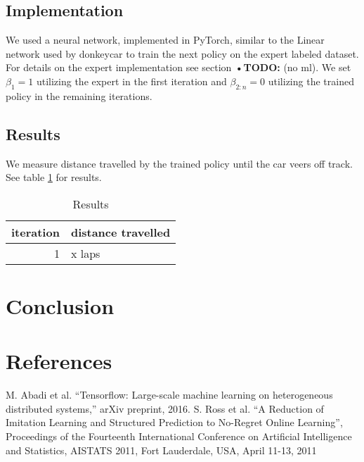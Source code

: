 \documentclass[conference]{IEEEtran}
\begin{document}
\subsection{Implementation}
We used a neural network, implemented in PyTorch, similar to the Linear network used by donkeycar to train the next policy on the expert labeled dataset. For details on the expert implementation see section \textbf{•TODO:} (no ml). We set \( \beta_1 = 1 \) utilizing the expert in the first iteration and \( \beta_{2:n} = 0 \) utilizing the trained policy in the remaining iterations.

\subsection{Results}
We measure distance travelled by the trained policy until the car veers off track. See table \ref{tab:results} for results.

\begin{table}[!t]
\renewcommand{\arraystretch}{1.3}
\caption{Results}
\centering
\begin{tabular}{r|l}
iteration&distance travelled\\
\hline
1&x laps\\
\end{tabular}
\label{tab:results}
\end{table}

\section{Conclusion}

\section*{References}

\begin{thebibliography}{00}
	
 M. Abadi et al. ``Tensorflow: Large-scale machine learning on heterogeneous distributed systems,'' arXiv preprint, 2016.
 S. Ross et al. ``A Reduction of Imitation Learning and Structured Prediction to No-Regret Online Learning'', Proceedings of the Fourteenth International Conference on Artificial Intelligence and Statistics, {AISTATS} 2011, Fort Lauderdale, USA, April 11-13, 2011
\end{thebibliography}
\end{document}
